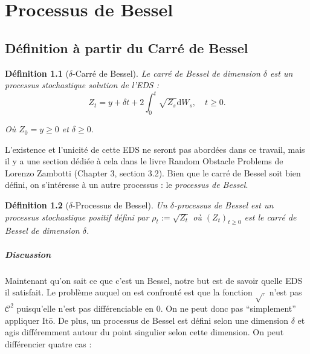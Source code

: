 \documentclass[openany]{book}
\newcommand{\1}{\mathbbm{1}}
\renewcommand{\d}{\mathrm{d}}
\theoremstyle{thmfont}
\theoremstyle{deffont}
\newtheorem{definition}[definition]{Définition}
\theoremstyle{thmfont}
\theoremstyle{deffont}
\begin{document}
\chapter{Processus de Bessel}

\section{Définition à partir du Carré de Bessel} 
\begin{definition}[$\delta$-Carré de Bessel] Le \textit{carré de Bessel} de dimension $\delta$ est un processus stochastique solution de l'EDS :
  \begin{equation}
    Z_t = y + \delta t + 2 \int_0^t \sqrt{Z_s} \d W_s, \quad t\geq0.
    \label{eq:EDSCarreBessel}
  \end{equation}

  Où $Z_0 = y \geq 0$ et $\delta \geq 0$.
\end{definition}

L'existence et l'unicité de cette EDS ne seront pas abordées dans ce travail, mais il y a une section dédiée à cela dans le livre Random Obstacle Problems de Lorenzo Zambotti (Chapter 3, section 3.2).
Bien que le carré de Bessel soit bien défini, on s’intéresse à un autre processus : le \textit{processus de Bessel}.

\begin{definition}[$\delta$-Processus de Bessel] Un $\delta$-\textit{processus de Bessel} est un processus stochastique positif défini par $\rho_t := \sqrt{Z_t}$ où $(Z_t)_{t\geq0}$ est le carré de Bessel de dimension $\delta$. 
\end{definition}

\paragraph{Discussion}
Maintenant qu'on sait ce que c'est un Bessel, notre but est de savoir quelle EDS il satisfait. Le problème auquel on est confronté est que la fonction $\sqrt{.}$ n'est pas $\mathcal C^2$ puisqu'elle n'est pas différenciable en 0. On ne peut donc pas ``simplement'' appliquer Itō. De plus, un processus de Bessel est défini selon une dimension $\delta$ et agis différemment autour du point singulier selon cette dimension. On peut différencier quatre cas : 
\end{document}
